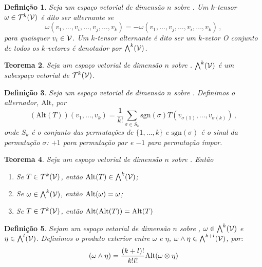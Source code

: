 \documentclass[a4paper,12pt]{extreport}
\newtheorem{mydef}{Definição}
\newtheorem{myteo}[mydef]{Teorema}
\begin{document}
\begin{mydef}
  Seja \Vcal{} um espaço vetorial de dimensão $n$ sobre \realnumb{}.
  Um $k$-tensor $\omega \in \mathcal{T}^k(\mathcal{V})$
  é dito ser alternante se
  \begin{equation}
    \omega(v_1, \dots, v_i, \dots, v_j, \dots, v_k) =
    - \omega(v_1, \dots, v_j, \dots, v_i, \dots, v_k)\,,
  \end{equation}
  para quaisquer $v_i \in \mathcal{V}$.
  Um $k$-tensor alternante é dito ser um \emph{$k$-vetor}
  O conjunto de todos os $k$-vetores é denotador por
  $\bigwedge^k (\mathcal{V})$.
\end{mydef}


\begin{myteo}
  Seja \Vcal{} um espaço vetorial de dimensão $n$ sobre \realnumb{}.
  $\bigwedge^k (\mathcal{V})$ é um subespaço vetorial de $\mathcal{T}^k(\mathcal{V})$.
\end{myteo}


\begin{mydef}
  Seja \Vcal{} um espaço vetorial de dimensão $n$ sobre \realnumb{}.
  Definimos o \emph{alternador}, $\mathrm{Alt}$, por
  \begin{equation}
    (\mathrm{Alt}(T)) (v_1, \dots, v_k) =
    \frac{1}{k!}
    \sum_{\sigma \in S_k}
    \mathrm{sgn}(\sigma) T(v_{\sigma(1)}, \dots, v_{\sigma(k)})\,,
  \end{equation}
  onde $S_k$ é o conjunto das permutações de $\{1, \dots, k\}$
  e $\mathrm{sgn}(\sigma)$ é o sinal da permutação $\sigma$:
  $+1$ para permutação par e $-1$ para permutação ímpar.
\end{mydef}


\begin{myteo}
  Seja \Vcal{} um espaço vetorial de dimensão $n$ sobre \realnumb{}.
  Então
  \begin{enumerate}[label=\alph*)]
  \item Se $T \in \mathcal{T}^k(\mathcal{V})$,
    então $\mathrm{Alt} (T) \in \bigwedge^k (\mathcal{V})$;
  \item Se $\omega \in \bigwedge^k(\mathcal{V})$,
    então $\mathrm{Alt} (\omega) = \omega$;
  \item Se $T \in \mathcal{T}^k(\mathcal{V})$,
    então $\mathrm{Alt} (\mathrm{Alt} (T)) = \mathrm{Alt}(T)$
  \end{enumerate}
\end{myteo}


\begin{mydef}
  Sejam \Vcal{} um espaço vetorial de dimensão $n$ sobre \realnumb{},
  $\omega \in \bigwedge^k(\mathcal{V})$ e $\eta \in \bigwedge^l(\mathcal{V})$.
  Definimos o \emph{produto exterior} entre $\omega$ e $\eta$,
  $\omega \wedge \eta \in \bigwedge^{k+l}(\mathcal{V})$, por:
  \begin{equation}
    (\omega \wedge \eta) = \frac{(k+l)!}{k!l!} \mathrm{Alt}(\omega \otimes \eta)
  \end{equation}
\end{mydef}
\end{document}
